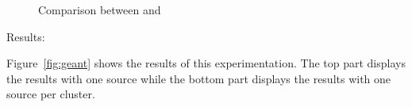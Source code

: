 \begin{asparadesc}
\begin{figure}
  \hspace{5pt}
  \caption{\label{fig:europe-ases} Comparison between \NAME and \NAMEC}
\end{figure}



\item [Results:]

Figure~\ref{fig:geant} shows the results of this experimentation. The
top part displays the results with one source while the bottom part
displays the results with one source per cluster.


\end{asparadesc}
